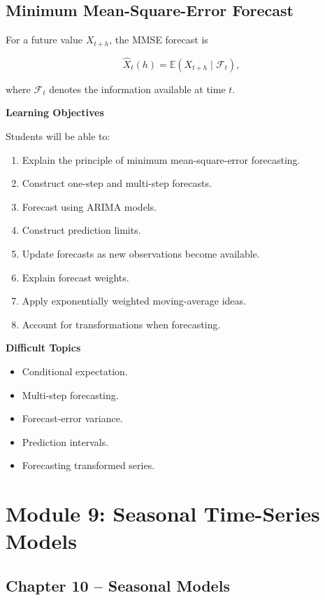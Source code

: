 \documentclass[11pt,a4paper]{article}
\newcommand{\E}{\mathbb{E}}
\begin{document}
\subsection{Minimum Mean-Square-Error Forecast}

For a future value $X_{t+h}$, the MMSE forecast is

\[
\hat X_t(h)
=
\E(X_{t+h}\mid \mathcal{F}_t),
\]

where $\mathcal{F}_t$ denotes the information available at time $t$.

\textbf{Learning Objectives}

Students will be able to:

\begin{enumerate}
    \item Explain the principle of minimum mean-square-error forecasting.
    \item Construct one-step and multi-step forecasts.
    \item Forecast using ARIMA models.
    \item Construct prediction limits.
    \item Update forecasts as new observations become available.
    \item Explain forecast weights.
    \item Apply exponentially weighted moving-average ideas.
    \item Account for transformations when forecasting.
\end{enumerate}

\textbf{Difficult Topics}

\begin{itemize}
    \item Conditional expectation.
    \item Multi-step forecasting.
    \item Forecast-error variance.
    \item Prediction intervals.
    \item Forecasting transformed series.
\end{itemize}

\section{Module 9: Seasonal Time-Series Models}

\subsection{Chapter 10 -- Seasonal Models}
\end{document}
